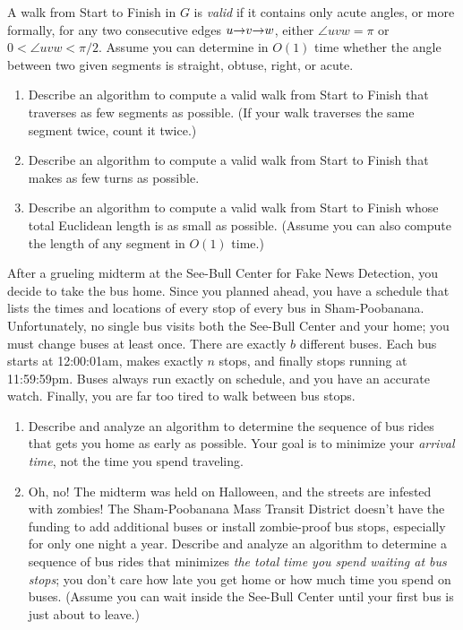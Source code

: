 \begin{exercises}
A walk from \textsf{Start} to \textsf{Finish} in $G$ is \textit{valid} if it contains only acute angles, or more formally, for any two consecutive edges $u\mathord{\rightarrow}v\mathord{\rightarrow}w$, either $\angle uvw = \pi$ or $0 < \angle uvw < \pi/2$.
Assume you can determine in $O(1)$ time whether the angle between two given segments is straight, obtuse, right, or acute.
\begin{enumerate}
\item Describe an algorithm to compute a valid walk from \textsf{Start} to \textsf{Finish} that traverses as few segments as possible.
(If your walk traverses the same segment twice, count it twice.)
\item Describe an algorithm to compute a valid walk from \textsf{Start} to \textsf{Finish} that makes as few turns as possible.
\item Describe an algorithm to compute a valid walk from \textsf{Start} to \textsf{Finish} whose total Euclidean length is as small as possible.
(Assume you can also compute the length of any segment in $O(1)$ time.)
\end{enumerate}

\item After a grueling midterm at the See-Bull Center for Fake News Detection, you decide to take the bus home.
Since you planned ahead, you have a schedule that lists the times and locations of every stop of every bus in Sham-Poobanana.
Unfortunately, no single bus visits both the See-Bull Center and your home; you must change buses at least once.
There are exactly $b$ different buses.
Each bus starts at 12:00:01am, makes exactly $n$ stops, and finally stops running at 11:59:59pm.
Buses always run exactly on schedule, and you have an accurate watch.
Finally, you are far too tired to walk between bus stops.
\begin{enumerate}
\item Describe and analyze an algorithm to determine the sequence of bus rides that gets you home as early as possible.
Your goal is to minimize your \textit{arrival time}, not the time you spend traveling.
\item Oh, no!
The midterm was held on Halloween, and the streets are infested with zombies!
The Sham-Poobanana Mass Transit District doesn’t have the funding to add additional buses or install zombie-proof bus stops, especially for only one night a year.
Describe and analyze an algorithm to determine a sequence of bus rides that minimizes \textit{the total time you spend waiting at bus stops}; you don’t care how late you get home or how much time you spend on buses.
(Assume you can wait inside the See-Bull Center until your first bus is just about to leave.)
\end{enumerate}


\end{exercises}

